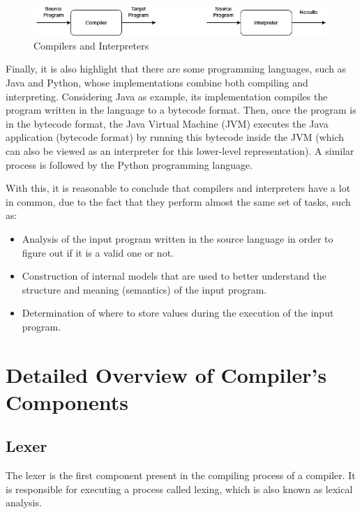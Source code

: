 \begin{figure}[H]  
  \centering
  \includegraphics[width=\textwidth, height=\textheight, keepaspectratio]{Figures/Arquiteturas/Compilers and Interpreters.png}  
  \caption{Compilers and Interpreters}
  \label{fig:CompilersAndInterpreters}
\end{figure}

Finally, it is also highlight that there are some programming languages, such as Java and Python, whose implementations combine both compiling and interpreting. Considering Java as example, its implementation compiles the program written in the language to a bytecode format. Then, once the program is in the bytecode format, the Java Virtual Machine (JVM) executes the Java application (bytecode format) by running this bytecode inside the JVM (which can also be viewed as an interpreter for this lower-level representation). A similar process is followed by the Python programming language.

With this, it is reasonable to conclude that compilers and interpreters have a lot in common, due to the fact that they perform almost the same set of tasks, such as:
\begin{itemize}
    \item Analysis of the input program written in the source language in order to figure out if it is a valid one or not.
    \item Construction of internal models that are used to better understand the structure and meaning (semantics) of the input program.
    \item Determination of where to store values during the execution of the input program.
    
\end{itemize}

\section{Detailed Overview of Compiler's Components}

\subsection{Lexer}
The lexer is the first component present in the compiling process of a compiler. It is responsible for executing a process called lexing, which is also known as lexical analysis.

